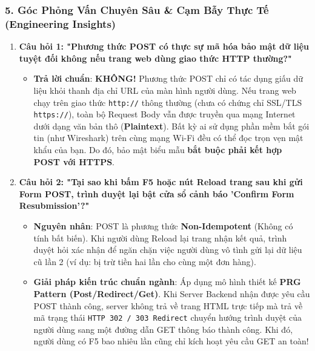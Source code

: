 \documentclass[11pt,oneside]{book}
\newcommand{\codeinline}[1]{\textcolor{accentOrange}{\texttt{#1}}}
\newcommand{\term}[1]{\textbf{\textcolor{primaryBlue}{#1}}}
\begin{document}
\subsubsection{5. Góc Phỏng Vấn Chuyên Sâu \& Cạm Bẫy Thực Tế (Engineering Insights)}

\begin{conceptBox}
\begin{enumerate}[leftmargin=1.5em, itemsep=5pt, parsep=0pt]
    \item \textbf{Câu hỏi 1: "Phương thức POST có thực sự mã hóa bảo mật dữ liệu tuyệt đối không nếu trang web dùng giao thức HTTP thường?"}
    \begin{itemize}[leftmargin=1.2em, itemsep=2pt]
        \item \textbf{Trả lời chuẩn}: \textbf{KHÔNG!} Phương thức POST chỉ có tác dụng giấu dữ liệu khỏi thanh địa chỉ URL của màn hình người dùng. Nếu trang web chạy trên giao thức \codeinline{http://} thông thường (chưa có chứng chỉ SSL/TLS \codeinline{https://}), toàn bộ Request Body vẫn được truyền qua mạng Internet dưới dạng văn bản thô (\term{Plaintext}). Bất kỳ ai sử dụng phần mềm bắt gói tin (như Wireshark) trên cùng mạng Wi-Fi đều có thể đọc trọn vẹn mật khẩu của bạn. Do đó, bảo mật biểu mẫu \textbf{bắt buộc phải kết hợp POST với HTTPS}.
    \end{itemize}
    \item \textbf{Câu hỏi 2: "Tại sao khi bấm F5 hoặc nút Reload trang sau khi gửi Form POST, trình duyệt lại bật cửa sổ cảnh báo 'Confirm Form Resubmission'?"}
    \begin{itemize}[leftmargin=1.2em, itemsep=2pt]
        \item \textbf{Nguyên nhân}: POST là phương thức \term{Non-Idempotent} (Không có tính bất biến). Khi người dùng Reload lại trang nhận kết quả, trình duyệt hỏi xác nhận để ngăn chặn việc người dùng vô tình gửi lại dữ liệu cũ lần 2 (ví dụ: bị trừ tiền hai lần cho cùng một đơn hàng).
        \item \textbf{Giải pháp kiến trúc chuẩn ngành}: Áp dụng mô hình thiết kế \term{PRG Pattern (Post/Redirect/Get)}. Khi Server Backend nhận được yêu cầu POST thành công, server không trả về trang HTML trực tiếp mà trả về mã trạng thái \codeinline{HTTP 302 / 303 Redirect} chuyển hướng trình duyệt của người dùng sang một đường dẫn GET thông báo thành công. Khi đó, người dùng có F5 bao nhiêu lần cũng chỉ kích hoạt yêu cầu GET an toàn!
    \end{itemize}
\end{enumerate}
\end{conceptBox}
\end{document}
